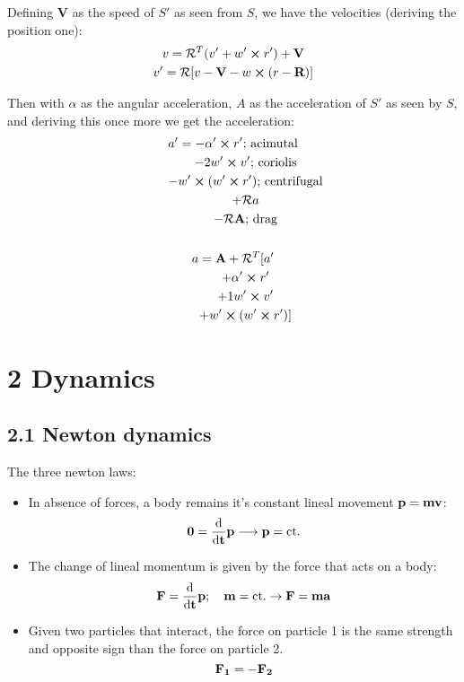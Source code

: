 \documentclass[a4paper,landscape,10pt]{cheatsheet}
\begin{document}
Defining $\textbf{V}$ as the speed of $S'$ as seen from $S$, we have the velocities (deriving the position one):
\begin{gather*}
  v=\mathcal{R}^T(v'+w'\cross r') + \textbf{V} \\
  v'=\mathcal{R}[v-\textbf{V}-w\cross(r-\textbf{R})]
\end{gather*}

Then with $\alpha$ as the angular acceleration, $A$ as the acceleration of $S'$ as seen by $S$, and deriving this once more we get the acceleration:
\begin{gather*}
  a' = -\alpha'\cross r' \text{; acimutal}\\
  \quad\quad - 2w'\cross v' \text{; coriolis}\\
  \quad\quad - w'\cross (w'\cross r') \text{; centrifugal}\\
  \quad\quad + \mathcal{R}a \\
  \quad\quad -\mathcal{R}\textbf{A} \text{; drag}\\
  \\
  a = \textbf{A} + \mathcal{R}^T[a' \\
  \quad\quad +\alpha'\cross r' \\
  \quad\quad + 1w'\cross v' \\
  \quad\quad + w'\cross (w'\cross r')] \\
\end{gather*}


\section{2 Dynamics}
\subsection*{2.1 Newton dynamics}
The three newton laws:
\begin{itemize}
  \item In absence of forces, a body remains it's constant lineal movement $\bf{p} = m\bf{v}$:
        $$
          \bf{0} = \derivative{}{t}\bf{p} \longrightarrow \bf{p} = \text{ct.}
        $$
  \item The change of lineal momentum is given by the force that acts on a body:
        $$
          \bf{F} = \derivative{}{t}\bf{p}; \quad m=\text{ct.} \rightarrow \bf{F} = m\bf{a}
        $$
  \item Given two particles that interact, the force on particle 1 is the same strength and opposite sign than the force
        on particle 2.
        $$
          \bf{F}_1 = -\bf{F}_2
        $$
\end{itemize}
\end{document}
